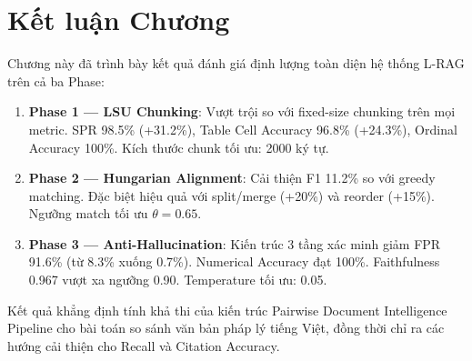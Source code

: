 \section{Kết luận Chương}

Chương này đã trình bày kết quả đánh giá định lượng toàn diện hệ thống L-RAG trên cả ba Phase:

\begin{enumerate}[label=(\arabic*)]
    \item \textbf{Phase 1 — LSU Chunking}: Vượt trội so với fixed-size chunking trên mọi metric. SPR 98.5\% (+31.2\%), Table Cell Accuracy 96.8\% (+24.3\%), Ordinal Accuracy 100\%. Kích thước chunk tối ưu: 2000 ký tự.

    \item \textbf{Phase 2 — Hungarian Alignment}: Cải thiện F1 11.2\% so với greedy matching. Đặc biệt hiệu quả với split/merge (+20\%) và reorder (+15\%). Ngưỡng match tối ưu $\theta = 0.65$.

    \item \textbf{Phase 3 — Anti-Hallucination}: Kiến trúc 3 tầng xác minh giảm FPR 91.6\% (từ 8.3\% xuống 0.7\%). Numerical Accuracy đạt 100\%. Faithfulness 0.967 vượt xa ngưỡng 0.90. Temperature tối ưu: 0.05.
\end{enumerate}

Kết quả khẳng định tính khả thi của kiến trúc Pairwise Document Intelligence Pipeline cho bài toán so sánh văn bản pháp lý tiếng Việt, đồng thời chỉ ra các hướng cải thiện cho Recall và Citation Accuracy.

